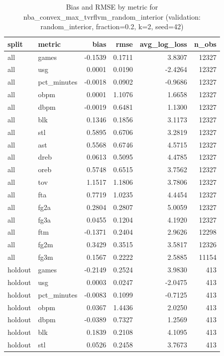 \begin{table}
\caption{Bias and RMSE by metric for nba_convex_max_tvrflvm_random_interior (validation: random_interior, fraction=0.2, k=2, seed=42)}
\label{tab:nba_convex_max_tvrflvm_random_interior_vs_random_interior_f20_k2_s42_bias_rmse}
\begin{tabular}{llrrrr}
\toprule
split & metric & bias & rmse & avg\_log\_loss & n\_obs \\
\midrule
all & games & -0.1539 & 0.1711 & 3.8307 & 12327 \\
all & usg & 0.0001 & 0.0190 & -2.4264 & 12327 \\
all & pct\_minutes & -0.0018 & 0.0902 & -0.9686 & 12327 \\
all & obpm & 0.0001 & 1.1076 & 1.6658 & 12327 \\
all & dbpm & -0.0019 & 0.6481 & 1.1300 & 12327 \\
all & blk & 0.1346 & 0.1856 & 3.1173 & 12327 \\
all & stl & 0.5895 & 0.6706 & 3.2819 & 12327 \\
all & ast & 0.5568 & 0.6746 & 4.5715 & 12327 \\
all & dreb & 0.0613 & 0.5095 & 4.4785 & 12327 \\
all & oreb & 0.5748 & 0.6515 & 3.7562 & 12327 \\
all & tov & 1.1517 & 1.1806 & 3.7806 & 12327 \\
all & fta & 0.7719 & 1.0235 & 4.4454 & 12327 \\
all & fg2a & 0.2804 & 0.2807 & 5.0059 & 12327 \\
all & fg3a & 0.0455 & 0.1204 & 4.1920 & 12327 \\
all & ftm & -0.1371 & 0.2404 & 2.9626 & 12298 \\
all & fg2m & 0.3429 & 0.3515 & 3.5817 & 12326 \\
all & fg3m & 0.1567 & 0.2222 & 2.5885 & 11154 \\
holdout & games & -0.2149 & 0.2524 & 3.9830 & 413 \\
holdout & usg & 0.0003 & 0.0247 & -2.0475 & 413 \\
holdout & pct\_minutes & -0.0083 & 0.1099 & -0.7125 & 413 \\
holdout & obpm & 0.0367 & 1.4436 & 2.0250 & 413 \\
holdout & dbpm & -0.0389 & 0.7327 & 1.2569 & 413 \\
holdout & blk & 0.1839 & 0.2108 & 4.1095 & 413 \\
holdout & stl & 0.0526 & 0.2458 & 3.7673 & 413 \\

\end{tabular}
\end{table}
